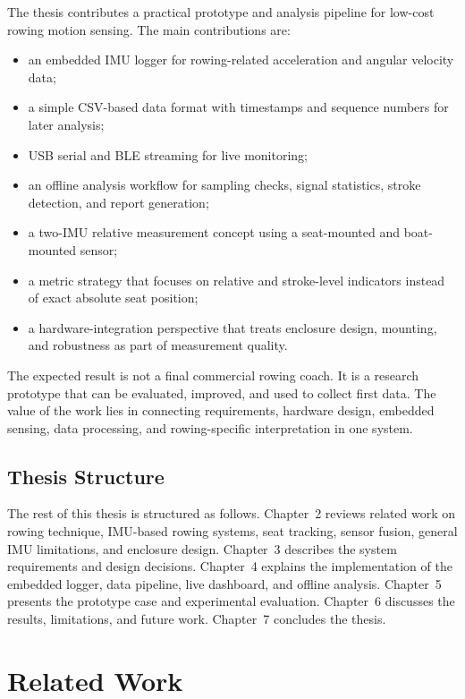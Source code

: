 The thesis contributes a practical prototype and analysis pipeline for low-cost rowing motion sensing. The main contributions are:

\begin{itemize}
  \item an embedded IMU logger for rowing-related acceleration and angular velocity data;
  \item a simple CSV-based data format with timestamps and sequence numbers for later analysis;
  \item USB serial and BLE streaming for live monitoring;
  \item an offline analysis workflow for sampling checks, signal statistics, stroke detection, and report generation;
  \item a two-IMU relative measurement concept using a seat-mounted and boat-mounted sensor;
  \item a metric strategy that focuses on relative and stroke-level indicators instead of exact absolute seat position;
  \item a hardware-integration perspective that treats enclosure design, mounting, and robustness as part of measurement quality.
\end{itemize}

The expected result is not a final commercial rowing coach. It is a research prototype that can be evaluated, improved, and used to collect first data. The value of the work lies in connecting requirements, hardware design, embedded sensing, data processing, and rowing-specific interpretation in one system.

\section{Thesis Structure}

The rest of this thesis is structured as follows. Chapter~2 reviews related work on rowing technique, IMU-based rowing systems, seat tracking, sensor fusion, general IMU limitations, and enclosure design. Chapter~3 describes the system requirements and design decisions. Chapter~4 explains the implementation of the embedded logger, data pipeline, live dashboard, and offline analysis. Chapter~5 presents the prototype case and experimental evaluation. Chapter~6 discusses the results, limitations, and future work. Chapter~7 concludes the thesis.


\chapter{Related Work} %

